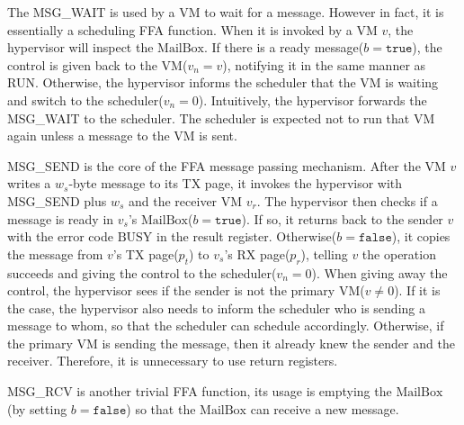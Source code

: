 \documentclass[a4paper]{article}
\newcommand*{\MB}{\text{MailBox}}
\newcommand*{\YIELD}{\text{YIELD}}
\newcommand*{\instr}[1]{\texttt{#1}}
\begin{document}

The MSG\_WAIT is used by a VM to wait for a message. However in fact, it is
essentially a scheduling FFA function. When it is invoked by a VM $v$, the
hypervisor will inspect the $\MB$. If there is a ready
message($b=\mathtt{true}$), the control is given back to the VM($v_{n}=v$),
notifying it in the same manner as RUN. Otherwise, the hypervisor informs the
scheduler that the VM is waiting and switch to the scheduler($v_{n}=0$).
Intuitively, the hypervisor forwards the MSG\_WAIT to the scheduler. The scheduler
is expected not to run that VM again unless a message to the VM is sent.

MSG\_SEND is the core of the FFA message passing mechanism. After the VM $v$
writes a $w_{s}$-byte message to its TX page, it invokes the hypervisor with
MSG\_SEND plus $w_{s}$ and the receiver VM $v_{r}$. The hypervisor then checks
if a message is ready in $v_{s}$'s $\MB$($b=\mathtt{true}$). If so, it returns
back to the sender $v$ with the error code $\text{BUSY}$ in the result register.
Otherwise($b=\mathtt{false}$), it copies the message from $v$'s TX page($p_{t}$)
to $v_{s}$'s RX page($p_{r}$), telling $v$ the operation succeeds and giving the
control to the scheduler($v_{n}=0$). When giving away the control, the hypervisor
sees if the sender is not the primary VM($v\neq 0$). If it is the case, the
hypervisor also needs to inform the scheduler who is sending a message to whom,
so that the scheduler can schedule accordingly. Otherwise, if the primary VM is
sending the message, then it already knew the sender and the receiver.
Therefore, it is unnecessary to use return registers.

MSG\_RCV is another trivial FFA function, its usage is emptying the $\MB$(by
setting $b=\mathtt{false}$) so that the $\MB$ can receive a new message.

\end{document}
